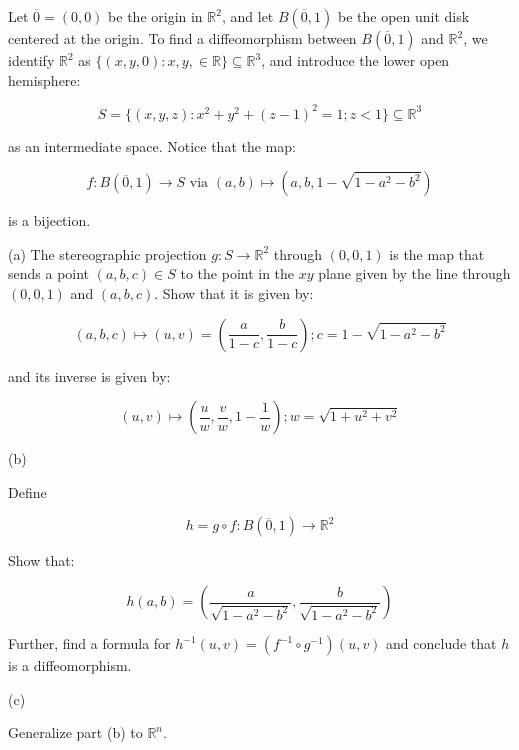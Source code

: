 \documentclass[10pt]{article}
\newenvironment{problem}[2][]{\begin{trivlist}
\item[\hskip \labelsep {\bfseries #1}\hskip \labelsep {\bfseries #2.}]}{\end{trivlist}}
\begin{document}
\begin{problem}{Question 2}

Let $\overline{0} = (0,0)$ be the origin in $\mathbb{R}^2$, and let $B(\overline{0},1)$ be the open unit disk centered at the origin. To find a diffeomorphism between $B(\overline{0},1)$ and $\mathbb{R}^2$, we identify $\mathbb{R}^2$ as $\{ (x,y,0) : x,y, \in \mathbb{R} \} \subseteq \mathbb{R}^3$, and introduce the lower open hemisphere:

$$ S = \{ (x,y,z) : x^2 + y^2 + (z-1)^2 = 1; z < 1 \} \subseteq \mathbb{R}^3 $$

as an intermediate space. Notice that the map:

$$f: B(\overline{0},1) \to S \text{ via } (a,b) \mapsto (a,b,1 - \sqrt{1 - a^2 - b^2}) $$

is a bijection.

(a) The stereographic projection $g: S \to \mathbb{R}^2$ through $(0,0,1)$ is the map that sends a point $(a,b,c) \in S$ to the point in the $xy$ plane given by the line through $(0,0,1)$ and $(a,b,c)$. Show that it is given by:

$$(a,b,c) \mapsto (u,v) = \left( \frac{a}{1-c}, \frac{b}{1-c} \right); c =1 - \sqrt{1 - a^2 -b^2} $$

and its inverse is given by:

$$(u,v) \mapsto \left( \frac{u}{w}, \frac{v}{w}, 1 - \frac{1}{w} \right); w = \sqrt{1 + u^2 + v^2} $$

(b) 

Define

$$h = g \circ f :  B(\overline{0},1) \to \mathbb{R}^2$$

Show that:

$$h(a,b) = \left( \frac{a}{\sqrt{1 - a^2 - b^2}}, \frac{b}{\sqrt{1 - a^2 - b^2}} \right)$$

Further, find a formula for $h^{-1}(u,v) = (f^{-1} \circ g^{-1})(u,v)$ and conclude that $h$ is a diffeomorphism. 

(c)

Generalize part (b) to $\mathbb{R}^n$.

\end{problem}
\end{document}
